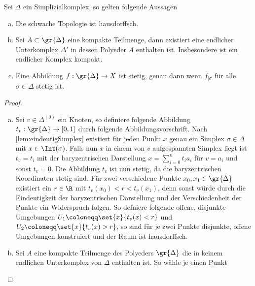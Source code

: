 \begin{Satz}
  Sei $\Delta$ ein Simplizialkomplex, so gelten folgende Aussagen
  \begin{enumerate}[(a)]
        \item Die schwache Topologie ist hausdorffsch.
        \item Sei $A \subset \gr{\Delta}$ eine kompakte Teilmenge,
          dann existiert eine endlicher Unterkomplex $\Delta'$ in
          dessen Polyeder $A$ enthalten ist. Insbesondere ist ein
          endlicher Komplex kompakt.
        \item Eine Abbildung $f: \gr{\Delta} \rightarrow X$ ist
          stetig, genau dann wenn $f_{| \sigma}$ für alle
          $\sigma \in \Delta$ stetig ist.
	\end{enumerate}
	\begin{proof}
          \begin{enumerate}[(a)]
          \item Sei $v \in \Delta^{(0)}$ ein Knoten, so definiere
            folgende Abbildung
            $t_v : \gr{\Delta} \rightarrow [0,1]$ durch folgende
            Abbildungsvorschrift.  Nach \cref{lem:eindeutigSimplex}
            existiert für jeden Punkt $x$ genau ein Simplex
            $\sigma \in \Delta$ mit $x \in \Int(\sigma)$. Falls nun
            $x$ in einem von $v$ aufgespannten Simplex liegt ist
            $t_v = t_i$ mit der baryzentrischen Darstellung
            $x = \sum^{n}_{i=0} t_i a_i$ für $v=a_i $ und sonst
            $t_v = 0$.  Die Abbildung $t_v$ ist nun stetig, da die
            baryzentrischen Koordinaten stetig sind. Für zwei
            verschiedene Punkte $x_0,x_1 \in \gr{\Delta}$ existiert
            ein $r \in \R$ mit $t_v(x_0) < r < t_v(x_1)$, denn sonst
            würde durch die Eindeutigkeit der baryzentrischen
            Darstellung und der Verschiedenheit der Punkte ein
            Widerspruch folgen. So defniere folgende offene, disjunkte
            Umgebungen $U_1 \coloneqq \set{x}{ t_v(x)<r}$ und
            $U_2 \coloneqq \set{x}{ t_v(x)>r}$, so sind für je zwei
            Punkte disjunkte, offene Umgebungen konstruiert und der
            Raum ist hausdorffsch.
          \item Sei $A$ eine kompakte Teilmenge des Polyeders
            $\gr{\Delta}$ die in keinem endlichen Unterkomplex von
            $\Delta$ enthalten ist. So wähle je einen Punkt

\end{enumerate}
\end{proof}
\end{Satz}
